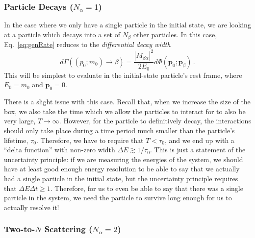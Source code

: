 \documentclass{article}
\numberwithin{equation}{subsection}
\begin{document}
\subsubsection{Particle Decays ($N_\alpha = 1$)}

In the case where we only have a single particle in the initial state, we are looking at a particle which decays into a set of $N_\beta$ other particles. In this case,
Eq.~\eqref{eq:genRate} reduces to the \textit{differential decay width}
\begin{equation}\label{eq:decayRate}
	d\Gamma((p_0;m_0) \to \beta) = \frac{|M_{\beta\alpha}|^2}{2 E_0}d\Phi(\mathbf{p}_0;\mathbf{p}_\beta)\,.
\end{equation}
This will be simplest to evaluate in the initial-state particle's rest frame, where $E_0 = m_0$ and $\mathbf{p}_0 = 0$.

There is a slight issue with this case. Recall that, when we increase the size of the box, we also take the time which we allow the particles to interact for
to also be very large, $T\to\infty$. However, for the particle to definitively decay, the interactions should only take place during a time period much
smaller than the particle's lifetime, $\tau_0$. Therefore, we have to require that $T< \tau_0$, and we end up with a ``delta function'' with non-zero
width $\Delta E \gtrsim 1/\tau_0$. This is just a statement of the uncertainty principle: if we are measuring the energies of the system, we should have
at least good enough energy resolution to be able to say that we actually had a single particle in the initial state, but the uncertainty principle requires
that $\Delta E\Delta t \geq 1$. Therefore, for us to even be able to say that there was a single particle in the system, we need the particle to survive long
enough for us to actually resolve it!

\subsubsection{Two-to-$N$ Scattering ($N_\alpha = 2$)}
\end{document}
